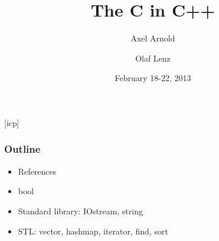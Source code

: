 \documentclass{slides}
\begin{document}
\graphicspath{{figures/}}

\title[The C in C++]{\Large The C in C++}

\author[A. Arnold and O. Lenz]{Axel Arnold \and Olaf Lenz} 
\date{February 18-22, 2013}

\begin{frame}
  \titlepage
\end {frame}
[icp]

\begin{frame}
  \frametitle{Outline}
  \begin{itemize}
  \item References
  \item bool
  \item Standard library: IOstream, string
  \item STL: vector, hashmap, iterator, find, sort
  \end{itemize}
\end{frame}
\end{document}
